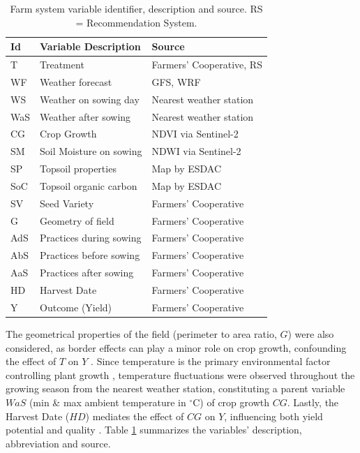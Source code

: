 \documentclass[letterpaper]{article} %
\begin{document}
\begin{table}[!ht]
\small
\centering
\begin{tabular}{lll}
\toprule
\textbf{Id} & \textbf{Variable Description}           & \textbf{Source}         \\ \midrule
T   & Treatment & Farmers' Cooperative, RS
\\
WF  & Weather forecast             & GFS, WRF                \\
WS  & Weather on sowing day        & Nearest weather station \\
WaS & Weather after sowing         & Nearest weather station                  \\
CG  & Crop Growth                  & NDVI via Sentinel-2                      \\
SM  & Soil Moisture on sowing      & NDWI via Sentinel-2     \\
SP  & Topsoil properties           & Map by ESDAC \\
SoC & Topsoil organic carbon       & Map by ESDAC \\
SV  & Seed Variety                 & Farmers' Cooperative \\
G   & Geometry of field           & Farmers' Cooperative                  \\
AdS & Practices during sowing      & Farmers' Cooperative \\
AbS & Practices before sowing      & Farmers' Cooperative \\
AaS & Practices after sowing       & Farmers' Cooperative \\
HD  & Harvest Date                 & Farmers' Cooperative \\
Y   & Outcome (Yield)              & Farmers' Cooperative \\ \bottomrule
\end{tabular}%
\caption{Farm system variable identifier, description and source. RS = Recommendation System.}
\label{tab:variables}
\end{table}

The geometrical properties of the field (perimeter to area ratio, $G$) were also considered, as border effects can play a minor role on crop growth, confounding the effect of $T$ on $Y$
\cite{green1956border}. Since temperature is the primary environmental factor controlling plant growth \cite{bange2004impact,hatfield2015temperature}, temperature fluctuations were observed throughout the growing season from the nearest weather station, constituting a parent variable $WaS$ (min \& max ambient temperature in $^\circ$C) of crop growth $CG$.
Lastly, the Harvest Date ($HD$) mediates the effect of $CG$ on $Y$, influencing both yield potential and quality \cite{dong2006yield,bange2008managing}. Table \ref{tab:variables} summarizes the variables' description, abbreviation and source.
\end{document}
